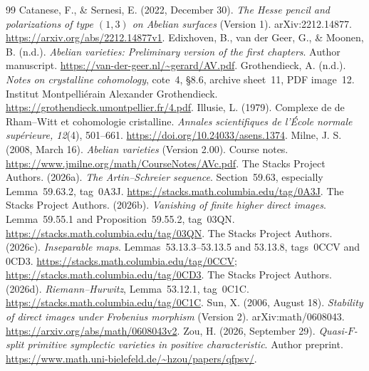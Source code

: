 \documentclass[11pt]{article}
\theoremstyle{remark}\newtheorem{remark}[theorem]{Remark}
\begin{document}
\begin{thebibliography}{99}
Catanese, F., \& Sernesi, E. (2022, December 30). \emph{The Hesse pencil and polarizations of type $(1,3)$ on Abelian surfaces} (Version 1). arXiv:2212.14877. \url{https://arxiv.org/abs/2212.14877v1}.
Edixhoven, B., van der Geer, G., \& Moonen, B. (n.d.). \emph{Abelian varieties: Preliminary version of the first chapters}. Author manuscript. \url{https://van-der-geer.nl/~gerard/AV.pdf}.
Grothendieck, A. (n.d.). \emph{Notes on crystalline cohomology}, cote~4, \S8.6, archive sheet~11, PDF image~12. Institut Montpelli\'erain Alexander Grothendieck. \url{https://grothendieck.umontpellier.fr/4.pdf}.
Illusie, L. (1979). Complexe de de Rham--Witt et cohomologie cristalline. \emph{Annales scientifiques de l'\'Ecole normale sup\'erieure, 12}(4), 501--661. \url{https://doi.org/10.24033/asens.1374}.
Milne, J. S. (2008, March 16). \emph{Abelian varieties} (Version 2.00). Course notes. \url{https://www.jmilne.org/math/CourseNotes/AVc.pdf}.
The Stacks Project Authors. (2026a). \emph{The Artin--Schreier sequence}. Section~59.63, especially Lemma~59.63.2, tag~0A3J. \url{https://stacks.math.columbia.edu/tag/0A3J}.
The Stacks Project Authors. (2026b). \emph{Vanishing of finite higher direct images}. Lemma~59.55.1 and Proposition~59.55.2, tag~03QN. \url{https://stacks.math.columbia.edu/tag/03QN}.
The Stacks Project Authors. (2026c). \emph{Inseparable maps}. Lemmas~53.13.3--53.13.5 and 53.13.8, tags~0CCV and 0CD3. \url{https://stacks.math.columbia.edu/tag/0CCV}; \url{https://stacks.math.columbia.edu/tag/0CD3}.
The Stacks Project Authors. (2026d). \emph{Riemann--Hurwitz}, Lemma~53.12.1, tag~0C1C. \url{https://stacks.math.columbia.edu/tag/0C1C}.
Sun, X. (2006, August 18). \emph{Stability of direct images under Frobenius morphism} (Version 2). arXiv:math/0608043. \url{https://arxiv.org/abs/math/0608043v2}.
Zou, H. (2026, September 29). \emph{Quasi-$F$-split primitive symplectic varieties in positive characteristic}. Author preprint. \url{https://www.math.uni-bielefeld.de/~hzou/papers/qfpsv/}.
\end{thebibliography}
\end{document}

